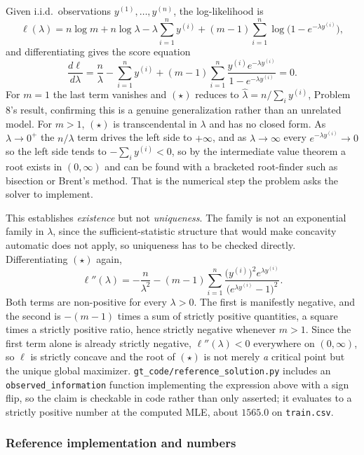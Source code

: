 \documentclass[11pt]{article}
\begin{document}
Given i.i.d.\ observations $y^{(1)},\dots,y^{(n)}$, the log-likelihood is
\[
  \ell(\lambda) = n\log m + n\log\lambda - \lambda\sum_{i=1}^n y^{(i)}
  + (m-1)\sum_{i=1}^n \log\!\big(1-e^{-\lambda y^{(i)}}\big),
\]
and differentiating gives the score equation
\[
  \frac{d\ell}{d\lambda} = \frac{n}{\lambda} - \sum_{i=1}^n y^{(i)}
  + (m-1)\sum_{i=1}^n \frac{y^{(i)} e^{-\lambda y^{(i)}}}{1-e^{-\lambda y^{(i)}}} = 0.
  \tag{$\star$}
\]
For $m=1$ the last term vanishes and $(\star)$ reduces to
$\hat\lambda = n/\sum_i y^{(i)}$, Problem 8's result, confirming this is a
genuine generalization rather than an unrelated model. For $m>1$, $(\star)$ is
transcendental in $\lambda$ and has no closed form. As $\lambda \to 0^+$ the
$n/\lambda$ term drives the left side to $+\infty$, and as $\lambda\to\infty$
every $e^{-\lambda y^{(i)}} \to 0$ so the left side tends to
$-\sum_i y^{(i)} < 0$, so by the intermediate value theorem a root exists in
$(0,\infty)$ and can be found with a bracketed root-finder such as bisection or
Brent's method. That is the numerical step the problem asks the solver to
implement.

This establishes \emph{existence} but not \emph{uniqueness}. The family is not
an exponential family in $\lambda$, since the sufficient-statistic structure
that would make concavity automatic does not apply, so uniqueness has to be
checked directly. Differentiating $(\star)$ again,
\[
  \ell''(\lambda) = -\frac{n}{\lambda^2}
  - (m-1)\sum_{i=1}^n \frac{\big(y^{(i)}\big)^2 e^{\lambda y^{(i)}}}{\big(e^{\lambda y^{(i)}}-1\big)^2}.
\]
Both terms are non-positive for every $\lambda>0$. The first is manifestly
negative, and the second is $-(m-1)$ times a sum of strictly positive
quantities, a square times a strictly positive ratio, hence strictly negative
whenever $m>1$. Since the first term alone is already strictly negative,
$\ell''(\lambda) < 0$ everywhere on $(0,\infty)$, so $\ell$ is strictly concave
and the root of $(\star)$ is not merely \emph{a} critical point but the unique
global maximizer. \texttt{gt\_code/reference\_solution.py} includes an
\texttt{observed\_information} function implementing the expression above with a
sign flip, so the claim is checkable in code rather than only asserted; it
evaluates to a strictly positive number at the computed MLE, about $1565.0$ on
\texttt{train.csv}.

\subsubsection*{Reference implementation and numbers}
\end{document}
